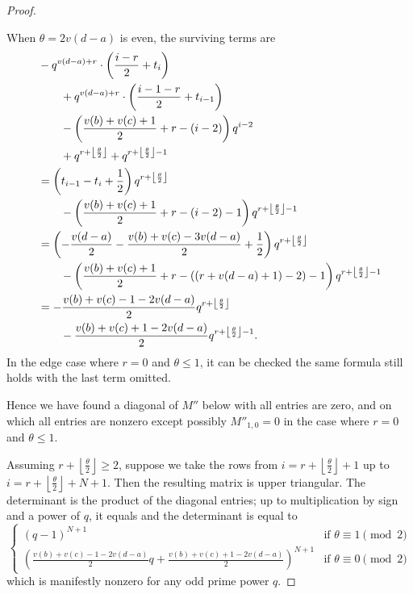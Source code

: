 \begin{proof}
\begin{itemize}
\begin{itemize}
      \ii When $\theta = 2v(d-a)$ is even, the surviving terms are
      \begin{align*}
        &-q^{v(d-a)+r} \cdot \left( \frac{i-r}{2} + t_{i} \right) \\
        &\qquad+ q^{v(d-a)+r} \cdot \left( \frac{i-1-r}{2} + t_{i-1} \right) \\
        &\qquad- \left( \frac{v(b)+v(c)+1}{2} + r - (i-2) \right) q^{i-2} \\
        &\qquad+ q^{r + \left\lfloor \frac{\theta}{2} \right\rfloor}
        + q^{r + \left\lfloor \frac{\theta}{2} \right\rfloor - 1} \\
        &= \left( t_{i-1}-t_i+\frac{1}{2}  \right) q^{r + \left\lfloor \frac{\theta}{2} \right\rfloor} \\
        &\qquad- \left( \frac{v(b)+v(c)+1}{2} + r - (i-2) - 1 \right) q^{r + \left\lfloor \frac{\theta}{2} \right\rfloor - 1} \\
        &= \left( -\frac{v(d-a)}{2} - \frac{v(b)+v(c)-3v(d-a)}{2} + \frac12 \right) q^{r + \left\lfloor \frac{\theta}{2} \right\rfloor} \\
        &\qquad- \left( \frac{v(b)+v(c)+1}{2} + r - ((r+v(d-a)+1)-2) - 1 \right) q^{r + \left\lfloor \frac{\theta}{2} \right\rfloor - 1} \\
        &= - \frac{v(b)+v(c)-1-2v(d-a)}{2} q^{r + \left\lfloor \frac{\theta}{2} \right\rfloor} \\
        &\qquad- \frac{v(b)+v(c)+1-2v(d-a)}{2} q^{r + \left\lfloor \frac{\theta}{2} \right\rfloor - 1}.
      \end{align*}
      In the edge case where $r = 0$ and $\theta \le 1$,
      it can be checked the same formula still holds with the last term omitted.
    \end{itemize}
  \end{itemize}
  Hence we have found a diagonal of $M''$ below with all entries are zero,
  and on which all entries are nonzero except possibly $M''_{1,0} = 0$
  in the case where $r = 0$ and $\theta \le 1$.

  Assuming $r + \left\lfloor \frac{\theta}{2} \right\rfloor \ge 2$,
  suppose we take the rows from $i = r + \left\lfloor \frac{\theta}{2} \right\rfloor + 1$
  up to $i = r + \left\lfloor \frac{\theta}{2} \right\rfloor + N + 1$.
  Then the resulting matrix is upper triangular.
  The determinant is the product of the diagonal entries;
  up to multiplication by sign and a power of $q$, it equals
  and the determinant is equal to
  \[
    \begin{cases}
    (q-1)^{N+1} & \text{if } \theta \equiv 1 \pmod 2 \\
    \left( \frac{v(b)+v(c)-1-2v(d-a)}{2} q + \frac{v(b)+v(c)+1-2v(d-a)}{2} \right)^{N+1} & \text{if } \theta \equiv 0 \pmod 2
    \end{cases}
  \]
  which is manifestly nonzero for any odd prime power $q$.


\end{proof}
